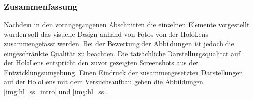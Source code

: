 \vspace{8px}
\begin{center}
	\\
\end{center}
\vspace{6px}

\subsubsection{Zusammenfassung}
Nachdem in den vorangegangenen Abschnitten die einzelnen Elemente vorgestellt wurden soll das visuelle Design anhand von Fotos von der HoloLens zusammengefasst werden. Bei der Bewertung der Abbildungen ist jedoch die eingeschränkte Qualität zu beachten. Die tatsächliche Darstellungsqualität auf der HoloLens entspricht den zuvor gezeigten Screenshots aus der Entwicklungsumgebung. Einen Eindruck der zusammengesetzten Darstellungen auf der HoloLens mit dem Versuchsaufbau geben die Abbildungen \ref{img:hl_ss_intro} und \ref{img:hl_ss}.\\%


